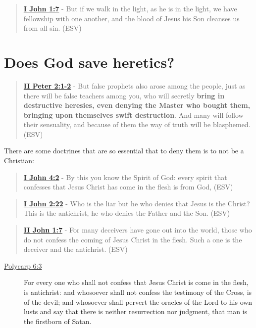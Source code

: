 \documentclass[11pt]{article}
\begin{document}
\begin{quote}
\textbf{\href{https://www.biblegateway.com/passage/?search=1\%20John\%201\%3A7\&version=ESV}{I John 1:7}} - But if we walk in the light, as he is in the light, we have fellowship with one another, and the blood of Jesus his Son cleanses us from all sin. (ESV)
\end{quote}

\section{Does God save heretics?}
\label{sec:org62cfa5c}
\begin{quote}
\textbf{\href{https://www.biblegateway.com/passage/?search=2\%20Peter\%202\%3A1-2\&version=ESV}{II Peter 2:1-2}} - But false prophets also arose among the people, just as there will be false teachers among you, who will secretly \textbf{bring in destructive heresies, even denying the Master who bought them, bringing upon themselves swift destruction}. And many will follow their sensuality, and because of them the way of truth will be blasphemed. (ESV)
\end{quote}

There are some doctrines that are so essential that to deny them is to not be a Christian:

\begin{quote}
\textbf{\href{https://www.biblegateway.com/passage/?search=1\%20John\%204\%3A2\&version=ESV}{I John 4:2}} - By this you know the Spirit of God: every spirit that confesses that Jesus Christ has come in the flesh is from God, (ESV)
\end{quote}

\begin{quote}
\textbf{\href{https://www.biblegateway.com/passage/?search=1\%20John\%202\%3A22\&version=ESV}{I John 2:22}} - Who is the liar but he who denies that Jesus is the Christ? This is the antichrist, he who denies the Father and the Son. (ESV)
\end{quote}

\begin{quote}
\textbf{\href{https://www.biblegateway.com/passage/?search=2\%20John\%201\%3A7\&version=ESV}{II John 1:7}} - For many deceivers have gone out into the world, those who do not confess the coming of Jesus Christ in the flesh. Such a one is the deceiver and the antichrist. (ESV)
\end{quote}

\begin{description}
\item[{\href{https://www.earlychristianwritings.com/text/polycarp-lightfoot.html}{Polycarp 6:3}}] For every one who shall not confess that Jesus Christ is come in the flesh, is antichrist: and whosoever shall not confess the testimony of the Cross, is of the devil; and whosoever shall pervert the oracles of the Lord to his own lusts and say that there is neither resurrection nor judgment, that man is the firstborn of Satan.
\end{description}
\end{document}
